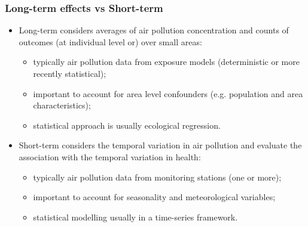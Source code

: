 \documentclass[slidestop,compress,serif,10pt]{beamer}
\begin{document}
\begin{frame}
\frametitle{Long-term effects vs Short-term}
\begin{itemize}
\vfill\item \alert{Long-term} considers averages of air pollution concentration and counts of outcomes (at individual level or) over small areas:
\begin{itemize}
\vfill\item typically air pollution data from exposure models (deterministic or more recently statistical);
\vfill\item important to account for area level confounders (e.g. population and area characteristics);
\vfill\item statistical approach is usually ecological regression.
\end{itemize}
\pause\vfill\item \alert{Short-term} considers the temporal variation in air pollution and evaluate the association with the temporal variation in health:
\begin{itemize}
\vfill\item typically air pollution data from monitoring stations (one or more);
\vfill\item important to account for seasonality and meteorological variables;
\vfill\item statistical modelling usually in a time-series framework.
\end{itemize}\end{itemize}
\end{frame}

\end{document}

